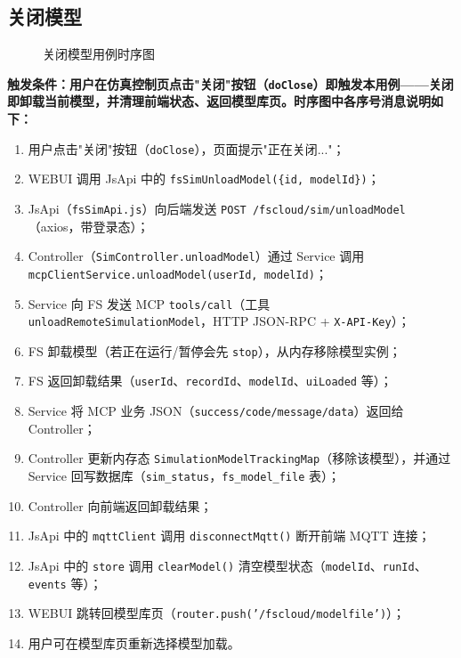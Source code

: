 \subsection{关闭模型}
\begin{figure}[!h]
	\centering
	\resizebox{1.0\linewidth}{!}{}
	\caption{关闭模型用例时序图}\label{fig:closeModel}
\end{figure}
\bf{触发条件}：用户在仿真控制页点击"关闭"按钮（\texttt{doClose}）即触发本用例——关闭即卸载当前模型，并清理前端状态、返回模型库页。时序图中各序号消息说明如下：
\begin{enumerate}[label=\arabic*)]
	\item 用户点击"关闭"按钮（\texttt{doClose}），页面提示"正在关闭..."；
	\item WEBUI 调用 JsApi 中的 \texttt{fsSimUnloadModel(\{id, modelId\})}；
	\item JsApi（\texttt{fsSimApi.js}）向后端发送 \texttt{POST /fscloud/sim/unloadModel}（axios，带登录态）；
	\item Controller（\texttt{SimController.unloadModel}）通过 Service 调用 \texttt{mcpClientService.unloadModel(userId, modelId)}；
	\item Service 向 FS 发送 MCP \texttt{tools/call}（工具 \texttt{unloadRemoteSimulationModel}，HTTP JSON-RPC + \texttt{X-API-Key}）；
	\item FS 卸载模型（若正在运行/暂停会先 \texttt{stop}），从内存移除模型实例；
	\item FS 返回卸载结果（\texttt{userId}、\texttt{recordId}、\texttt{modelId}、\texttt{uiLoaded} 等）；
	\item Service 将 MCP 业务 JSON（\texttt{success/code/message/data}）返回给 Controller；
	\item Controller 更新内存态 \texttt{SimulationModelTrackingMap}（移除该模型），并通过 Service 回写数据库（\texttt{sim\_status}，\texttt{fs\_model\_file} 表）；
	\item Controller 向前端返回卸载结果；
	\item JsApi 中的 \texttt{mqttClient} 调用 \texttt{disconnectMqtt()} 断开前端 MQTT 连接；
	\item JsApi 中的 \texttt{store} 调用 \texttt{clearModel()} 清空模型状态（\texttt{modelId}、\texttt{runId}、\texttt{events} 等）；
	\item WEBUI 跳转回模型库页（\texttt{router.push('/fscloud/modelfile')}）；
	\item 用户可在模型库页重新选择模型加载。
\end{enumerate}
\newpage
